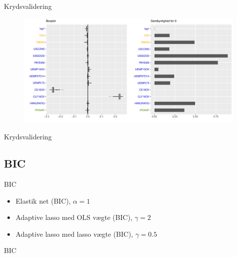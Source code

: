 \begin{frame}{Krydsvalidering}
\begin{figure}[!htb]
        \includegraphics[width=1\linewidth, height=0.7\textheight]{slides/boxplot_lasso_kryds.pdf}
\end{figure}
\end{frame}

\begin{frame}{Krydsvalidering}

\end{frame}

\subsection{BIC}
\begin{frame}{BIC}
\begin{itemize}
\item Elastik net (BIC), $\alpha = 1$
\item Adaptive lasso med OLS vægte (BIC), $\gamma = 2$
\item Adaptive lasso med lasso vægte (BIC), $\gamma = 0.5$
\end{itemize}
\end{frame}

\begin{frame}{BIC}

\end{frame}

